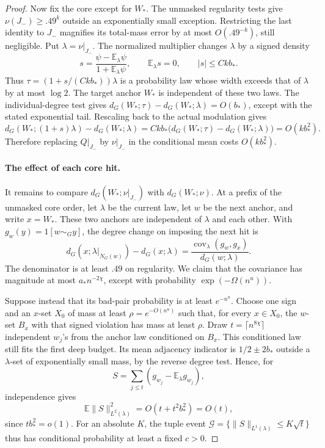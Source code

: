 \begin{proof}
Now fix the core except for \(W_*\). The unmasked regularity tests give \(\nu(J_-)\ge.49^k\) outside an exponentially small exception. Restricting the last identity to \(J_-\) magnifies its total-mass error by at most \(O(.49^{-k})\), still negligible. Put \(\lambda=\nu|_{J_-}\). The normalized multiplier changes \(\lambda\) by a signed density
\[
 s=\frac{\psi-\mathbb E_\lambda\psi}{1+\mathbb E_\lambda\psi},\qquad
 \mathbb E_\lambda s=0,\qquad |s|\le Ckb_*.
\]
Thus \(\tau=(1+s/(Ckb_*))\lambda\) is a probability law whose width exceeds that of \(\lambda\) by at most \(\log2\). The target anchor \(W_*\) is independent of these two laws. The individual-degree test gives \(d_G(W_*;\tau)-d_G(W_*;\lambda)=O(b_*)\), except with the stated exponential tail. Rescaling back to the actual modulation gives
\[
 d_G(W_*;(1+s)\lambda)-d_G(W_*;\lambda)
 =Ckb_*\bigl(d_G(W_*;\tau)-d_G(W_*;\lambda)\bigr)
 =O(kb_*^2).
\]
Therefore replacing \(Q|_{J_-}\) by \(\nu|_{J_-}\) in the conditional mean costs \(O(kb_*^2)\).

\paragraph{The effect of each core hit.}
It remains to compare \(d_G(W_*;\nu|_{J_-})\) with \(d_G(W_*;\nu)\). At a prefix of the unmasked core order, let \(\lambda\) be the current law, let \(w\) be the next anchor, and write \(x=W_*\). These two anchors are independent of \(\lambda\) and each other. With \(g_w(y)=1[w\sim_Gy]\), the degree change on imposing the next hit is
\[
 d_G(x;\lambda|_{N_G(w)})-d_G(x;\lambda)
 =\frac{\operatorname{cov}_\lambda(g_w,g_x)}{d_G(w;\lambda)}.
\]
The denominator is at least \(.49\) on regularity. We claim that the covariance has magnitude at most \(a_*n^{-2\chi}\), except with probability \(\exp(-\Omega(n^u))\).

Suppose instead that its bad-pair probability is at least \(e^{-n^u}\). Choose one sign and an \(x\)-set \(X_0\) of mass at least \(\rho=e^{-O(n^u)}\) such that, for every \(x\in X_0\), the \(w\)-set \(B_x\) with that signed violation has mass at least \(\rho\). Draw \(t=\lceil n^{8\chi}\rceil\) independent \(w_j\)'s from the anchor law conditioned on \(B_x\). This conditioned law still fits the first deep budget. Its mean adjacency indicator is \(1/2\pm2b_*\) outside a \(\lambda\)-set of exponentially small mass, by the reverse degree test. Hence, for
\[
 S=\sum_{j\le t}(g_{w_j}-\mathbb E_\lambda g_{w_j}),
\]
independence gives
\[
 \mathbb E\|S\|_{L^2(\lambda)}^2
       =O(t+t^2b_*^2)=O(t),
\]
since \(tb_*^2=o(1)\). For an absolute \(K\), the tuple event \(\mathcal G=\{\|S\|_{L^1(\lambda)}\le K\sqrt t\}\) thus has conditional probability at least a fixed \(c>0\).


\end{proof}
